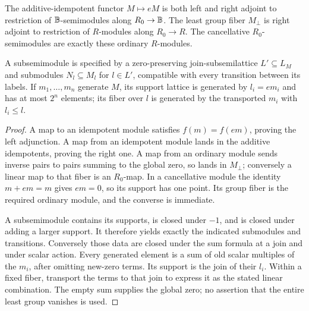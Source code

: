 \begin{proposition}\label{prop:diagram-consequences}
The additive-idempotent functor $M\mapsto eM$ is both left and right
adjoint to restriction of $\mathbb B$-semimodules along $R_0\to\mathbb B$.
The least group fiber $M_{\bot}$ is right adjoint to restriction of
$R$-modules along $R_0\to R$. The cancellative $R_0$-semimodules are
exactly these ordinary $R$-modules.

A subsemimodule is specified by a zero-preserving join-subsemilattice
$L'\subseteq L_M$ and submodules $N_l\subseteq M_l$ for $l\in L'$,
compatible with every transition between its labels. If $m_1,\ldots,m_n$
generate $M$, its support lattice is generated by $l_i=em_i$ and has at most
$2^n$ elements; its fiber over $l$ is generated by the transported $m_i$
with $l_i\le l$.
\end{proposition}
\begin{proof}
A map to an idempotent module satisfies $f(m)=f(em)$, proving the left
adjunction. A map from an idempotent module lands in the additive
idempotents, proving the right one. A map from an ordinary module sends
inverse pairs to pairs summing to the global zero, so lands in $M_{\bot}$;
conversely a linear map to that fiber is an $R_0$-map. In a cancellative
module the identity $m+em=m$ gives $em=0$, so its support has one point.
Its group fiber is the required ordinary module, and the converse is
immediate.

A subsemimodule contains its supports, is closed under $-1$, and is closed
under adding a larger support. It therefore yields exactly the indicated
submodules and transitions. Conversely those data are closed under the
sum formula at a join and under scalar action. Every generated element
is a sum of old scalar multiples of the $m_i$, after omitting new-zero
terms. Its support is the join of their $l_i$. Within a fixed fiber,
transport the terms to that join to express it as the stated linear
combination. The empty sum supplies the global zero; no assertion that
the entire least group vanishes is used.
\end{proof}

